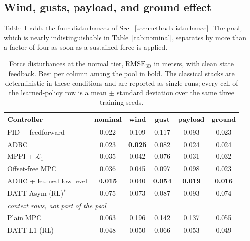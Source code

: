\subsection{Wind, gusts, payload, and ground effect}
\label{sec:results:disturbance}

Table~\ref{tab:matrix} adds the four disturbances of
Sec.~\ref{sec:method:disturbance}. The pool, which is nearly indistinguishable in
Table~\ref{tab:nominal}, separates by more than a factor of four as soon as a sustained
force is applied.

\begin{table}[t]
\caption{Force disturbances at the normal tier, $\mathrm{RMSE}_{\mathrm{3D}}$ in meters,
with clean state feedback. Best per column among the pool in bold. The classical stacks
are deterministic in these conditions and are reported as single runs; every cell of the
learned-policy row is a mean $\pm$ standard deviation over the same three training
seeds.}
\label{tab:matrix}
\begin{center}\small
\begin{tabular}{lccccc}
\toprule
Controller & nominal & wind & gust & payload & ground \\
\midrule
PID + feedforward        & 0.022 & 0.109 & 0.117 & 0.093 & 0.023 \\
ADRC                     & 0.023 & \textbf{0.025} & 0.082 & 0.024 & 0.024 \\
MPPI + $\mathcal{L}_1$   & 0.035 & 0.042 & 0.076 & 0.031 & 0.032 \\
Offset-free MPC          & 0.036 & 0.045 & 0.097 & 0.098 & 0.023 \\
ADRC + learned low level & \textbf{0.015} & 0.040 & \textbf{0.054} & \textbf{0.019} & \textbf{0.016} \\
DATT-Asym (RL)$^{\ast}$  & 0.075 & 0.073 & 0.087 & 0.093 & 0.074 \\
\midrule
\multicolumn{6}{l}{\emph{context rows, not part of the pool}} \\
Plain MPC                & 0.063 & 0.196 & 0.142 & 0.137 & 0.055 \\
DATT-L1 (RL)             & 0.048 & 0.050 & 0.066 & 0.053 & 0.049 \\
\bottomrule
\end{tabular}
\end{center}
\end{table}

